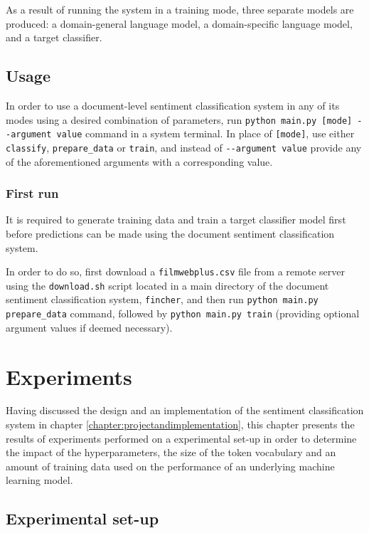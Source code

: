 As a result of running the system in a training mode, three separate models are produced: a domain-general language model, a domain-specific language model, and a target classifier. 

\section{Usage}

In order to use a document-level sentiment classification system in any of its modes using a desired combination of parameters, run \lstinline{python main.py [mode] --argument value} command in a system terminal. In place of \lstinline{[mode]}, use either \lstinline{classify}, \lstinline{prepare_data} or \lstinline{train}, and instead of \lstinline{--argument value} provide any of the aforementioned arguments with a corresponding value.

\subsection{First run}

It is required to generate training data and train a target classifier model first before predictions can be made using the document sentiment classification system.

In order to do so, first download a \lstinline{filmwebplus.csv} file from a remote server using the \lstinline{download.sh} script located in a main directory of the document sentiment classification system, \lstinline{fincher}, and then run \lstinline{python main.py prepare_data} command, followed by \lstinline{python main.py train} (providing optional argument values if deemed necessary).

\chapter{Experiments}
\label{chapter:experiments}

Having discussed the design and an implementation of the sentiment classification system in chapter \ref{chapter:projectandimplementation}, this chapter presents the results of experiments performed on a experimental set-up in order to determine the impact of the hyperparameters, the size of the token vocabulary and an amount of training data used on the performance of an underlying machine learning model.

\section{Experimental set-up}

